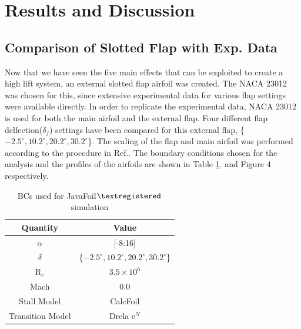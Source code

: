 \documentclass[main.tex]{subfiles}
\begin{document}
\section{Results and Discussion}

\subsection{Comparison of Slotted Flap with Exp. Data}
Now that we have seen the five main effects that can be exploited to create a high lift system, an external slotted flap airfoil was created. The NACA 23012 was chosen for this, since extensive experimental data for various flap settings were available directly. In order to replicate the experimental data\cite{wenzinger1939wind}, NACA 23012 is used for both the main airfoil and the external flap. Four different flap delfection($\delta_f$) settings have been compared for this external flap, \{$-2.5^{\circ},10.2^{\circ},20.2^{\circ},30.2^{\circ}$\}. The scaling of the flap and main airfoil was performed according to the procedure in Ref.\cite{wenzinger1939wind}. The boundary conditions chosen for the analysis and the profiles of the airfoils are shown in Table \ref{table1}. and Figure 4 respectively.
\begin{table}[h]\begin{center}\begin{tabular}{ c c } 
 \hline \rowcolor{lightgray}
  \hspace{0.5cm}Quantity\hspace{0.5cm} & \hspace{0.5cm}Value\hspace{0.5cm} \\
  \hline
  $\alpha$ & [-8:16]\\
 \hline
  $\delta$ & \{$-2.5^{\circ},10.2^{\circ},20.2^{\circ},30.2^{\circ}$\}\\
 \hline
  R$_e$ & $3.5\times10^6$  \\ 
   \hline
  Mach & 0.0  \\ 
   \hline
  Stall Model & CalcFoil \\ 
 \hline
 Transition Model & Drela e$^N$\\
\hline
\end{tabular}\caption{BCs used for JavaFoil$\textregistered$ simulation}\vspace*{-2em}\label{table1}\end{center}\end{table}
\end{document}
